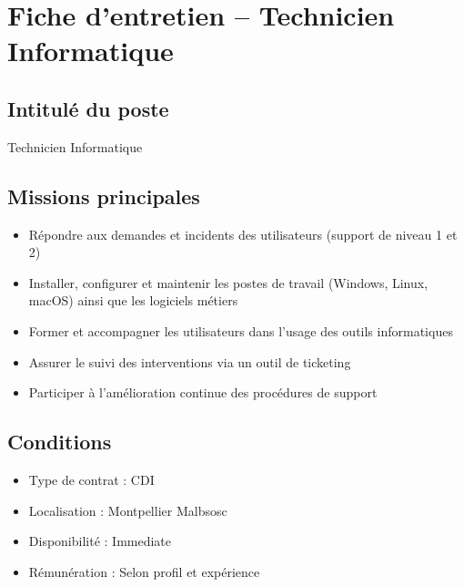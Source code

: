 \documentclass[12pt]{article}
\begin{document}
\section*{Fiche d'entretien – Technicien Informatique}

\subsection*{Intitulé du poste}
Technicien Informatique

\subsection*{Missions principales}
\begin{itemize}[leftmargin=1.5em]
    \item Répondre aux demandes et incidents des utilisateurs (support de niveau 1 et 2)
    \item Installer, configurer et maintenir les postes de travail (Windows, Linux, macOS) ainsi que les logiciels métiers
    \item Former et accompagner les utilisateurs dans l’usage des outils informatiques
    \item Assurer le suivi des interventions via un outil de ticketing
    \item Participer à l’amélioration continue des procédures de support
\end{itemize}



\subsection*{Conditions}
\begin{itemize}[leftmargin=1.5em]
    \item Type de contrat : CDI
    \item Localisation : Montpellier Malbsosc
    \item Disponibilité : Immediate
    \item Rémunération : Selon profil et expérience
\end{itemize}
\end{document}
